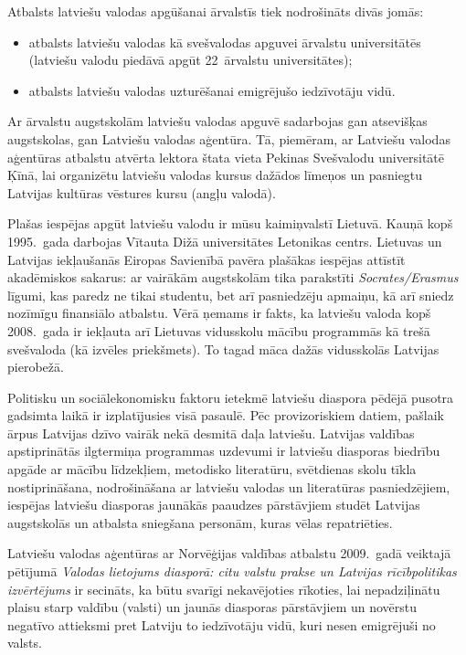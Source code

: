 \begin{multicols}{2}
Atbalsts latviešu valodas apgūšanai ārvalstīs tiek nodrošināts divās jomās:

\begin{itemize}
\item  atbalsts latviešu valodas kā svešvalodas apguvei ārvalstu universitātēs (latviešu valodu piedāvā apgūt 22~ārvalstu universitātes);
\item  atbalsts latviešu valodas uzturēšanai emigrējušo iedzīvotāju vidū.
\end{itemize}

Ar ārvalstu augstskolām latviešu valodas apguvē sadarbojas gan atsevišķas augstskolas, gan Latviešu valodas aģentūra. 
Tā, piemēram, ar Latviešu valodas aģentūras atbalstu atvērta lektora štata vieta Pekinas Svešvalodu universitātē Ķīnā, lai organizētu latviešu valodas kursus dažādos līmeņos un pasniegtu Latvijas kultūras vēstures kursu (angļu valodā). 

Plašas iespējas apgūt latviešu valodu ir mūsu kaimiņvalstī Lietuvā. 
Kauņā kopš 1995.~gada darbojas Vītauta Dižā universitātes Letonikas centrs. 
Lietuvas un Latvijas iekļaušanās Eiropas Savienībā pavēra plašākas iespējas attīstīt akadēmiskos sakarus: ar vairākām augstskolām tika parakstīti \textit{Socrates/Erasmus} līgumi, kas paredz ne tikai studentu, bet arī pasniedzēju apmaiņu, kā arī sniedz nozīmīgu finansiālo atbalstu. 
Vērā ņemams ir fakts, ka latviešu valoda kopš 2008.~gada ir iekļauta arī Lietuvas vidusskolu mācību programmās kā trešā svešvaloda (kā izvēles priekšmets). 
To tagad māca dažās vidusskolās Latvijas pierobežā.

Politisku un sociālekonomisku faktoru ietekmē latviešu diaspora pēdējā pusotra gadsimta laikā ir izplatījusies visā pasaulē. 
Pēc provizoriskiem datiem, pašlaik ārpus Latvijas dzīvo vairāk nekā desmitā daļa latviešu.
Latvijas valdības apstiprinātās ilgtermiņa programmas uzdevumi ir latviešu diasporas biedrību apgāde ar mācību līdzekļiem, metodisko literatūru, svētdienas skolu tīkla nostiprināšana, nodrošināšana ar latviešu valodas un literatūras pasniedzējiem, iespējas latviešu diasporas jaunākās paaudzes pārstāvjiem studēt Latvijas augstskolās un atbalsta sniegšana personām, kuras vēlas repatriēties. 

Latviešu valodas aģentūras ar Norvēģijas valdības atbalstu 2009.~gadā veiktajā pētījumā \textit{Valodas lietojums diasporā: citu valstu prakse un Latvijas rīcībpolitikas izvērtējums} \cite{Meta4} ir secināts, ka būtu svarīgi nekavējoties rīkoties, lai nepadziļinātu plaisu starp valdību (valsti) un jaunās diasporas pārstāvjiem un novērstu negatīvo attieksmi pret Latviju to iedzīvotāju vidū, kuri nesen emigrējuši no valsts.


\end{multicols}
